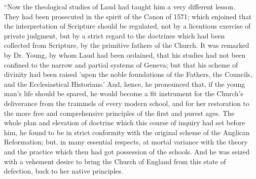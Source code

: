 ``Now the theological studies of Laud
had taught him a very different lesson. They had been prosecuted in the
spirit of the Canon of 1571; which enjoined that the interpretation of
Scripture should be regulated, not by a licentious exercise of private
judgment, but by a strict regard to the doctrines which had been
collected from Scripture, by the primitive fathers of the Church. It was
remarked by Dr. Young, by whom Laud had been ordained, that his studies
had not been confined to the narrow and partial systems of Geneva; but
that his scheme of divinity had been raised 'upon the noble foundations
of the Fathers, the Councils, and the Ecclesiastical Historians.' And,
hence, he pronounced that, if the young man's life should be spared, he
would become a fit instrument for the Church's deliverance from the
trammels of every modern school, and for her restoration to the more
free and comprehensive principles of the first and purest ages. The
whole plan and elevation of doctrine which this course of inquiry had
set before him, he found to be in strict conformity with the original
scheme of the Anglican Reformation; but, in
many essential respects, at mortal variance with the theory and the
practice which then had got possession of the schools. And he was seized
with a vehement desire to bring the Church of England from this state of
defection, back to her native principles.

